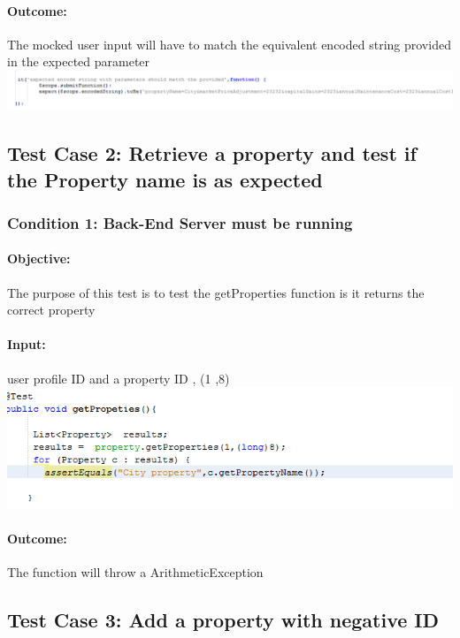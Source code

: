 \documentclass[a4paper,12pt]{article}
\begin{document}
\paragraph{Outcome: }The mocked user input will have to match the equivalent encoded string provided in the expected parameter\\
\includegraphics[width=1\textwidth]{./Images/expectedCase1.png}

\subsection{Test Case 2: Retrieve a property and test if the Property name is as expected}
\subsubsection{Condition 1: Back-End Server must be running}
\paragraph{Objective:}The purpose of this test is to test the getProperties function is it returns the correct property
\paragraph{Input:} user profile ID and a property ID , (1 ,8)\\
\includegraphics[width=1\textwidth]{./Images/expectedCase2.png}

\paragraph{Outcome: } The function will throw a ArithmeticException

\subsection{Test Case 3: Add a property with negative ID}
\end{document}
